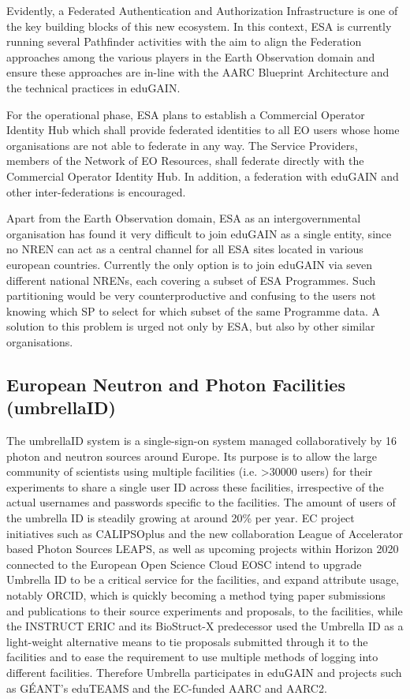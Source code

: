 \documentclass[fleqn,11pt]{wlscirep}
\begin{document}
{Evidently, a Federated Authentication and Authorization Infrastructure is one of the key building blocks of this new ecosystem. In this context, ESA is currently running several Pathfinder activities with the aim to align the Federation approaches among the various players in the Earth Observation domain and ensure these approaches are in-line with the AARC Blueprint Architecture and the technical practices in eduGAIN.

For the operational phase, ESA plans to establish a Commercial Operator Identity Hub which shall provide federated identities to all EO users whose home organisations are not able to federate in any way. The Service Providers, members of the Network of EO Resources, shall federate directly with the Commercial Operator Identity Hub. In addition, a federation with eduGAIN and other inter-federations is encouraged.

Apart from the Earth Observation domain, ESA as an intergovernmental organisation has found it very difficult to join eduGAIN as a single entity, since no NREN can act as a central channel for all ESA sites located in various european countries. Currently the only option is to join eduGAIN via seven different national NRENs, each covering a subset of ESA Programmes. Such partitioning would be very counterproductive and confusing to the users not knowing which SP to select for which subset of the same Programme data. A solution to this problem is urged not only by ESA, but also by other similar organisations.

\subsection{European Neutron and Photon Facilities (umbrellaID)}
The umbrellaID system is a single-sign-on system managed collaboratively by 16 photon and neutron sources around Europe. Its purpose is to allow the large community of scientists using multiple facilities (i.e. >30000 users) for their experiments to share a single user ID across these facilities, irrespective of the actual usernames and passwords specific to the facilities. The amount of users of the umbrella ID is steadily growing at around 20\% per year. 
EC project initiatives such as CALIPSOplus and the new collaboration League of Accelerator based Photon Sources LEAPS, as well as upcoming projects within Horizon 2020 connected to the European Open Science Cloud EOSC intend to upgrade Umbrella ID to be a critical service for the facilities, and expand attribute usage, notably ORCID, which is quickly becoming a method tying paper submissions and publications to their source experiments and proposals, to the facilities, while the INSTRUCT ERIC and its BioStruct-X predecessor used the Umbrella ID as a light-weight alternative means to tie proposals submitted through it to the facilities and to ease the requirement to use multiple methods of logging into different facilities. Therefore Umbrella participates  in eduGAIN and projects such as GÉANT’s eduTEAMS and the EC-funded AARC and AARC2.
 
}
\end{document}
